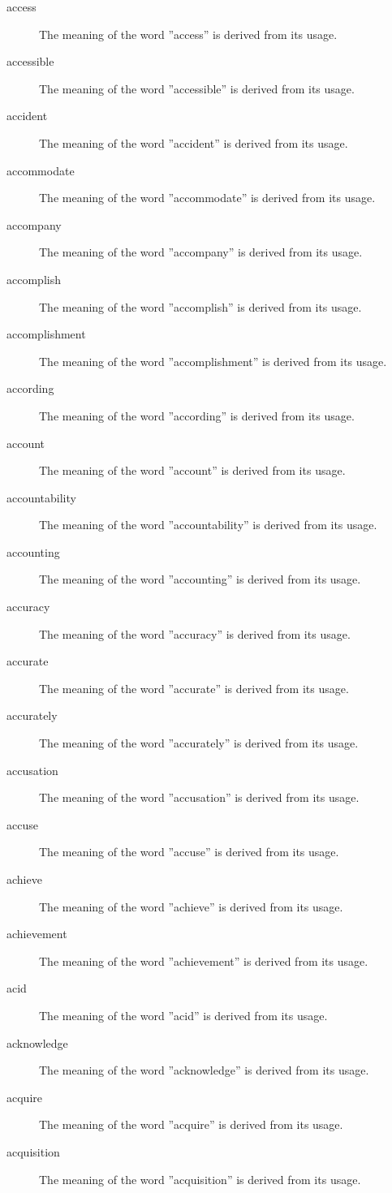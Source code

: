 \documentclass[12pt, letterpaper]{memoir}
\begin{document}
\begin{description}
\item[access] The meaning of the word ''access'' is derived from its usage.
\item[accessible] The meaning of the word ''accessible'' is derived from its usage.
\item[accident] The meaning of the word ''accident'' is derived from its usage.
\item[accommodate] The meaning of the word ''accommodate'' is derived from its usage.
\item[accompany] The meaning of the word ''accompany'' is derived from its usage.
\item[accomplish] The meaning of the word ''accomplish'' is derived from its usage.
\item[accomplishment] The meaning of the word ''accomplishment'' is derived from its usage.
\item[according] The meaning of the word ''according'' is derived from its usage.
\item[account] The meaning of the word ''account'' is derived from its usage.
\item[accountability] The meaning of the word ''accountability'' is derived from its usage.
\item[accounting] The meaning of the word ''accounting'' is derived from its usage.
\item[accuracy] The meaning of the word ''accuracy'' is derived from its usage.
\item[accurate] The meaning of the word ''accurate'' is derived from its usage.
\item[accurately] The meaning of the word ''accurately'' is derived from its usage.
\item[accusation] The meaning of the word ''accusation'' is derived from its usage.
\item[accuse] The meaning of the word ''accuse'' is derived from its usage.
\item[achieve] The meaning of the word ''achieve'' is derived from its usage.
\item[achievement] The meaning of the word ''achievement'' is derived from its usage.
\item[acid] The meaning of the word ''acid'' is derived from its usage.
\item[acknowledge] The meaning of the word ''acknowledge'' is derived from its usage.
\item[acquire] The meaning of the word ''acquire'' is derived from its usage.
\item[acquisition] The meaning of the word ''acquisition'' is derived from its usage.

\end{description}
\end{document}
